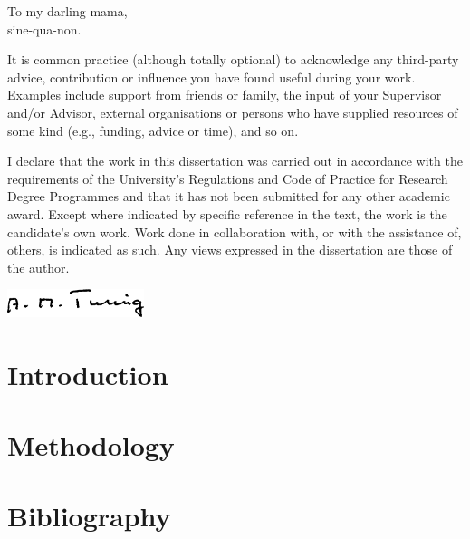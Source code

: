 \documentclass{uob-thesis}
\begin{document}
\begin{dedication}
  To my darling mama,\\
  sine-qua-non.
\end{dedication}

\begin{acknowledgements}
It is common practice (although totally optional) to acknowledge any third-party
advice, contribution or influence you have found useful during your work.
Examples include support from friends or family, the input of your Supervisor
and/or Advisor, external organisations or persons who  have supplied resources
of some kind (e.g., funding, advice or time), and so on.
\end{acknowledgements}

\begin{declaration}
  I declare that the work in this dissertation was carried out in accordance
  with the requirements of the University's Regulations and Code of Practice for
  Research Degree Programmes and that it has not been submitted for any other
  academic award. Except where indicated by specific reference in the text, the
  work is the candidate's own work. Work done in collaboration with, or with the
  assistance of, others, is indicated as such. Any views expressed in the
  dissertation are those of the author.
  
  \vspace{2cm}

  \includegraphics[width=4cm]{sig}
\end{declaration}




\frontmatter

\tableofcontents
\listoftables
\listoffigures



\mainmatter

\chapter{Introduction}

  

\chapter{Methodology}

  



\backmatter

\chapter*{Bibliography}

\printbibliography[heading=none]
\end{document}
